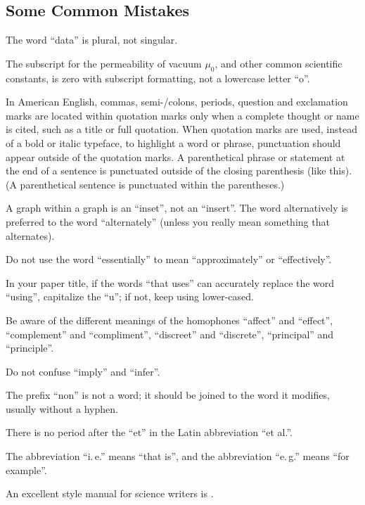 \documentclass[conference,pbalance]{iaria}
\begin{document}
\subsection{Some Common Mistakes}

\begin{compactitem}
\item The word “data” is plural, not singular.
\item The subscript for the permeability of vacuum $\mu_0$, and other common scientific constants, is zero with subscript formatting, not a lowercase letter “o”.
\item In American English, commas, semi-/colons, periods, question and exclamation marks are located within quotation marks only when a complete thought or name is cited, such as a title or full quotation. When quotation marks are used, instead of a bold or italic typeface, to highlight a word or phrase, punctuation should appear outside of the quotation marks. A parenthetical phrase or statement at the end of a sentence is punctuated outside of the closing parenthesis (like this). (A parenthetical sentence is punctuated within the parentheses.)
\item A graph within a graph is an “inset”, not an “insert”. The word alternatively is preferred to the word “alternately” (unless you really mean something that alternates).
\item Do not use the word “essentially” to mean “approximately” or “effectively”.
\item In your paper title, if the words “that uses” can accurately replace the word “using”, capitalize the “u”; if not, keep using lower-cased.
\item Be aware of the different meanings of the homophones “affect” and “effect”, “complement” and “compliment”, “discreet” and “discrete”, “principal” and “principle”.
\item Do not confuse “imply” and “infer”.
\item The prefix “non” is not a word; it should be joined to the word it modifies, usually without a hyphen.
\item There is no period after the “et” in the Latin abbreviation “et al.”.
\item The abbreviation “i.\,e.” means “that is”, and the abbreviation “e.\,g.” means “for example”.
\end{compactitem}

An excellent style manual for science writers is \cite{young2002technical}.
\end{document}
